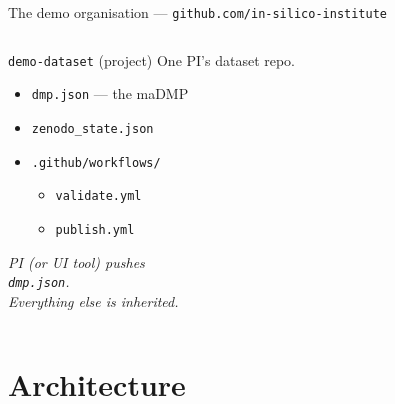 \documentclass[aspectratio=169]{beamer}
\begin{document}
\begin{frame}[shrink=5]{The demo organisation --- \texttt{github.com/in-silico-institute}}
\begin{columns}[T]
      \begin{block}{\texttt{demo-dataset} (project)}
        \footnotesize
        One PI's dataset repo.\\[4pt]
        \begin{itemize}\setlength\itemsep{1pt}
          \item \texttt{dmp.json} --- the maDMP
          \item \texttt{zenodo\_state.json}
          \item \texttt{.github/workflows/}
            \begin{itemize}
              \item \texttt{validate.yml}
              \item \texttt{publish.yml}
            \end{itemize}
        \end{itemize}
        \vspace{4pt}
        \textit{PI (or UI tool) pushes\\
        \texttt{dmp.json}.\\Everything else is inherited.}
      \end{block}
  \end{columns}
\end{frame}

\section{Architecture}
\end{document}
